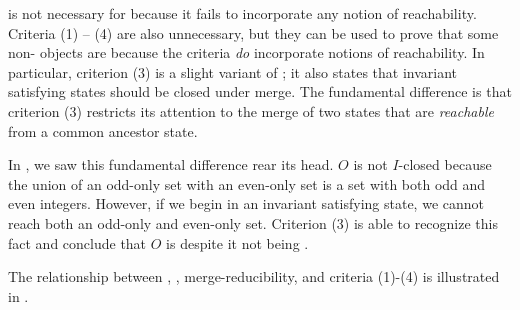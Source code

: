 {}

\Invariantclosure{} is not necessary for \invariantconfluence{} because it
fails to incorporate any notion of reachability. Criteria (1) -- (4) are also
unnecessary, but they can be used to prove that some non-\invariantclosed{}
objects are \invariantconfluent{} because the criteria \emph{do} incorporate
notions of reachability. In particular, criterion (3) is a slight variant of
\invariantclosure{}; it also states that invariant satisfying states should be
closed under merge. The fundamental difference is that criterion (3) restricts
its attention to the merge of two states that are \emph{reachable} from a
common ancestor state.

In , we saw this fundamental difference rear its head. $O$
is not $I$-closed because the union of an odd-only set with an even-only set is
a set with both odd and even integers. However, if we begin in an invariant
satisfying state, we cannot reach both an odd-only and even-only set.
Criterion (3) is able to recognize this fact and conclude that $O$ is
\invariantconfluent{} despite it not being \invariantclosed{}.

The relationship between \invariantconfluence{}, \invariantclosure{},
merge-reducibility, and criteria (1)-(4) is illustrated in
.
